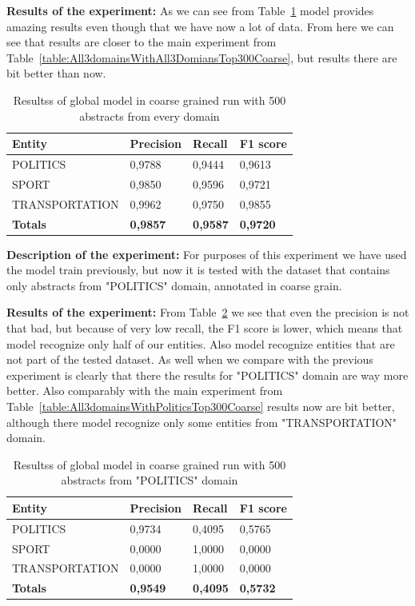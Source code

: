 \documentclass[thesis=M,english]{FITthesis}[2018/05/30]
\begin{document}
	\textbf{Results of the experiment:} As we can see from Table~\ref{table:500GlobalDomainWithAllAbstractsTop500Coarse} model provides amazing results even though that we have now a lot of data. From here we can see that results are closer to the main experiment from Table~\ref{table:All3domainsWithAll3DomiansTop300Coarse}, but results there are bit better than now. 

	\begin{table}[H]\centering
		\begin{tabular}{|l|l|l|l|}
			\hline {\textbf{Entity}} & {\textbf{Precision}} & {\textbf{Recall}} & {\textbf{F1 score}}\\\hline
				POLITICS & 0,9788 & 0,9444 & 0,9613\\
				SPORT & 0,9850 & 0,9596 & 0,9721\\
				TRANSPORTATION & 0,9962 & 0,9750 & 0,9855\\\hline
				\textbf{Totals} & \textbf{0,9857} & \textbf{0,9587} & \textbf{0,9720}\\\hline
		\end{tabular}
		\caption{Resultss of global model in coarse grained run with 500 abstracts from every domain \label{table:500GlobalDomainWithAllAbstractsTop500Coarse}}
	\end{table}

\textbf{Description of the experiment:} For purposes of this experiment we have used the model train previously, but now it is tested with the dataset that contains only abstracts from "POLITICS" domain, annotated in coarse grain.

	\textbf{Results of the experiment:} From Table~\ref{table:500GlobalDomainWithPoliticsTop500Coarse} we see that even the precision is not that bad, but because of very low recall, the F1 score is lower, which means that model recognize only half of our entities. Also model recognize entities that are not part of the tested dataset. As well when we compare with the previous experiment is clearly that there the results for "POLITICS" domain are way more better. Also comparably with the main experiment from Table~\ref{table:All3domainsWithPoliticsTop300Coarse} results now are bit better, although there model recognize only some entities from "TRANSPORTATION" domain.

	\begin{table}[H]\centering
		\begin{tabular}{|l|l|l|l|}
			\hline {\textbf{Entity}} & {\textbf{Precision}} & {\textbf{Recall}} & {\textbf{F1 score}}\\\hline
				POLITICS & 0,9734 & 0,4095 & 0,5765\\
				SPORT & 0,0000 & 1,0000 & 0,0000\\
				TRANSPORTATION & 0,0000 & 1,0000 & 0,0000\\\hline
				\textbf{Totals} & \textbf{0,9549} & \textbf{0,4095} & \textbf{0,5732}\\\hline
		\end{tabular}
		\caption{Resultss of global model in coarse grained run with 500 abstracts from "POLITICS" domain \label{table:500GlobalDomainWithPoliticsTop500Coarse}}
	\end{table}
\end{document}
